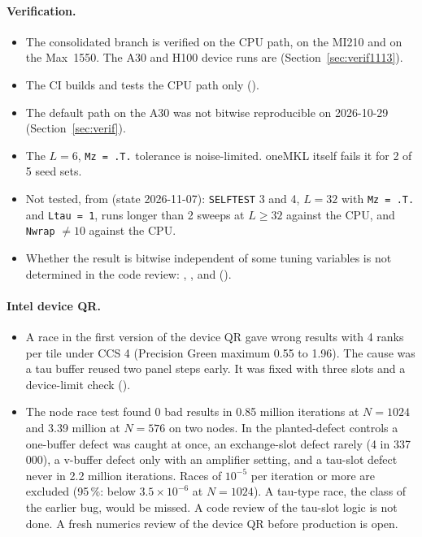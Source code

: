 \paragraph{Verification.}
\begin{itemize}
\item The consolidated branch is verified on the CPU path, on the MI210 and on the Max~1550. The A30 and H100 device runs are  (Section~\ref{sec:verif1113}).
\item The CI builds and tests the CPU path only ().
\item The default path on the A30 was not bitwise reproducible on 2026-10-29 (Section~\ref{sec:verif}).
\item The $L=6$, \texttt{Mz = .T.} tolerance is noise-limited. oneMKL itself fails it for 2 of 5 seed sets.
\item Not tested, from  (state 2026-11-07): \texttt{SELFTEST} 3 and 4, $L=32$ with \texttt{Mz = .T.} and \texttt{Ltau = 1}, runs longer than 2 sweeps at $L\ge32$ against the CPU, and \texttt{Nwrap} $\ne10$ against the CPU. 
\item Whether the result is bitwise independent of some tuning variables is not determined in the code review: , ,  and  ().
\end{itemize}

\paragraph{Intel device QR.}
\begin{itemize}
\item A race in the first version of the device QR gave wrong results with 4 ranks per tile under CCS 4 (Precision Green maximum 0.55 to 1.96). The cause was a tau buffer reused two panel steps early. It was fixed with three slots and a device-limit check ().
\item The node race test found 0 bad results in 0.85 million iterations at $N=1024$ and 3.39 million at $N=576$ on two nodes. In the planted-defect controls a one-buffer defect was caught at once, an exchange-slot defect rarely (4 in 337\,000), a v-buffer defect only with an amplifier setting, and a tau-slot defect never in 2.2 million iterations. Races of $10^{-5}$ per iteration or more are excluded (95\,\%: below $3.5\times10^{-6}$ at $N=1024$). A tau-type race, the class of the earlier bug, would be missed. A code review of the tau-slot logic is not done. A fresh numerics review of the device QR before production is open.
\end{itemize}

